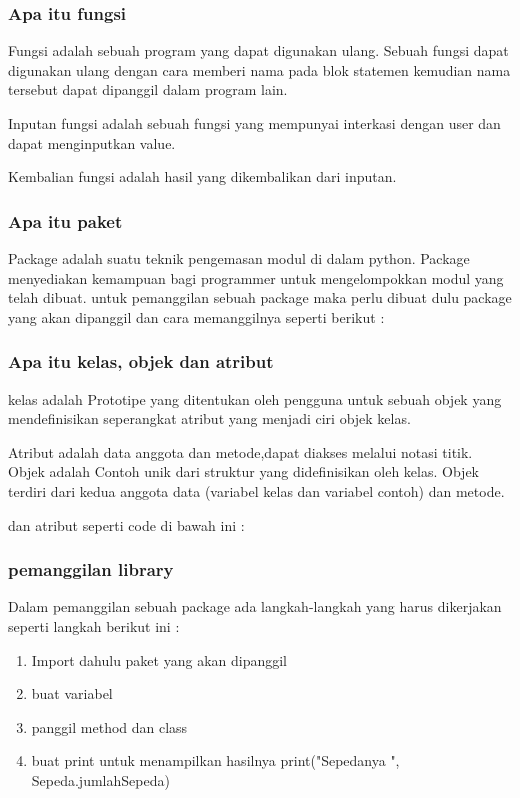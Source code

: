 \subsubsection{Apa itu fungsi}
Fungsi adalah sebuah program yang dapat digunakan ulang. Sebuah fungsi dapat digunakan ulang dengan cara memberi nama pada blok statemen kemudian nama tersebut dapat dipanggil dalam program lain. 

Inputan fungsi adalah sebuah fungsi yang mempunyai interkasi dengan user dan dapat menginputkan value.

Kembalian fungsi adalah hasil yang dikembalikan dari inputan.
 
\subsubsection{Apa itu paket}
Package adalah suatu teknik pengemasan modul di dalam python. Package menyediakan kemampuan bagi programmer untuk mengelompokkan modul yang telah dibuat. untuk pemanggilan sebuah package maka perlu dibuat dulu package yang akan dipanggil dan cara memanggilnya seperti berikut :


\subsubsection{Apa itu kelas, objek dan atribut}
kelas adalah Prototipe yang ditentukan oleh pengguna untuk sebuah objek yang mendefinisikan seperangkat atribut yang menjadi ciri objek kelas.

Atribut adalah data anggota dan metode,dapat diakses melalui notasi titik.
Objek adalah Contoh unik dari struktur yang didefinisikan oleh kelas. 
Objek terdiri dari kedua anggota data (variabel kelas dan variabel contoh) dan metode.

dan atribut seperti code di bawah ini :

\subsubsection{pemanggilan library}
Dalam pemanggilan sebuah package ada langkah-langkah yang harus dikerjakan seperti langkah berikut ini :
\begin{enumerate}
	\item Import dahulu paket yang akan dipanggil
	\item buat variabel
	\item panggil method dan class
	\item buat print untuk menampilkan hasilnya
	print("Sepedanya ", Sepeda.jumlahSepeda)
	
\end{enumerate}
